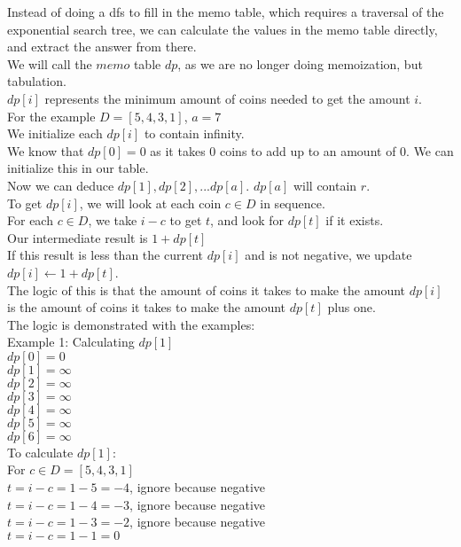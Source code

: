 Instead of doing a dfs to fill in the memo table, which requires a traversal of the exponential search tree, we can calculate the values in the memo table directly, and extract the answer from there.\\
We will call the $memo$ table $dp$, as we are no longer doing memoization, but tabulation.\\
$dp[i]$ represents the minimum amount of coins needed to get the amount $i$.\\
For the example $D = [5,4,3,1]$, $a = 7$\\
We initialize each $dp[i]$ to contain infinity.\\
We know that $dp[0] = 0$ as it takes $0$ coins to add up to an amount of $0$. We can initialize this in our table.\\
Now we can deduce $dp[1], dp[2], ... dp[a]$. $dp[a]$ will contain $r$.\\
To get $dp[i]$, we will look at each coin $c \in D$ in sequence.\\
For each $c \in D$, we take $i - c$ to get $t$, and look for $dp[t]$ if it exists.\\
Our intermediate result is $1 + dp[t]$\\
If this result is less than the current $dp[i]$ and is not negative, we update $dp[i] \leftarrow 1 + dp[t]$.\\
The logic of this is that the amount of coins it takes to make the amount $dp[i]$ is the amount of coins it takes to make the amount $dp[t]$ plus one.\\
The logic is demonstrated with the examples:\\
Example 1: Calculating $dp[1]$\\
$dp[0]=0$\\
$dp[1]=\infty$\\
$dp[2]=\infty$\\
$dp[3]=\infty$\\
$dp[4]=\infty$\\
$dp[5]=\infty$\\
$dp[6]=\infty$\\
To calculate $dp[1]$:\\
For $c \in D = [5,4,3,1]$\\
$t = i-c = 1-5 = -4$, ignore because negative\\
$t = i-c = 1-4 = -3$, ignore because negative\\
$t = i-c = 1-3 = -2$, ignore because negative\\
$t = i-c = 1-1 = 0$\\
